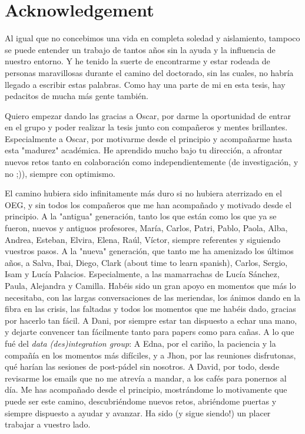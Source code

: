 %
\section*{Acknowledgement}
\label{sec::acknowledgement}


Al igual que no concebimos una vida en completa soledad y aislamiento, tampoco se puede entender un trabajo de tantos años sin la ayuda y la influencia de nuestro entorno. 
Y he tenido la suerte de encontrarme y estar rodeada de personas maravillosas durante el camino del doctorado, sin las cuales, no habría llegado a escribir estas palabras. 
Como hay una parte de mi en esta tesis, hay pedacitos de mucha más gente también.

Quiero empezar dando las gracias a Oscar, por darme la oportunidad de entrar en el grupo y poder realizar la tesis junto con compañeros y mentes brillantes. 
Especialmente a Oscar, por motivarme desde el principio y acompañarme hasta esta "madurez" académica. 
He aprendido mucho bajo tu dirección, a afrontar nuevos retos tanto en colaboración como independientemente (de investigación, y no ;)), siempre con optimismo.  

El camino hubiera sido infinitamente más duro si no hubiera aterrizado en el OEG, y sin todos los compañeros que me han acompañado y motivado desde el principio.
A la "antigua" generación, tanto los que están como los que ya se fueron, nuevos y antiguos profesores, María, Carlos, Patri, Pablo, Paola, Alba, Andrea, Esteban, Elvira, Elena, Raúl, Víctor, siempre referentes y siguiendo vuestros pasos. %
A la "nueva" generación, que tanto me ha amenizado los últimos años, a Salva, Ibai, Diego, Clark (about time to learn spanish), Carlos, Sergio, Isam y Lucía Palacios. 
Especialmente, a las mamarrachas de Lucía Sánchez, Paula, Alejandra y Camilla. 
Habéis sido un gran apoyo en momentos que más lo necesitaba, con las largas conversaciones de las meriendas, los ánimos dando en la fibra en las crisis, las faltadas y todos los momentos que me habéis dado, gracias por hacerlo tan fácil.
A Dani, por siempre estar tan dispuesto a echar una mano, y dejarte convencer tan fácilmente tanto para papers como para cañas. 
A lo que fué del \textit{data (des)integration group}: 
A Edna, por el cariño, la paciencia y la compañía en los momentos más difíciles, 
y a Jhon, por las reuniones disfrutonas, qué harían las sesiones de post-pádel sin nosotros.
A David, por todo, desde revisarme los emails que no me atrevía a mandar, a los cafés para ponernos al día. 
Me has acompañado desde el principio, mostrándome lo motivamente que puede ser este camino, descubriéndome nuevos retos, abriéndome puertas y siempre dispuesto a ayudar y avanzar. 
Ha sido (y sigue siendo!) un placer trabajar a vuestro lado.

